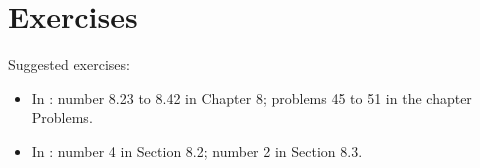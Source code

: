 \section{Exercises}

Suggested exercises:

\begin{itemize}
\item In \cite{Br}: number 8.23 to 8.42 in Chapter 8; problems 45 to
51 in the chapter Problems.
\item In \cite{McO}: number 4 in Section 8.2;
number 2 in Section 8.3. 
\end{itemize}

